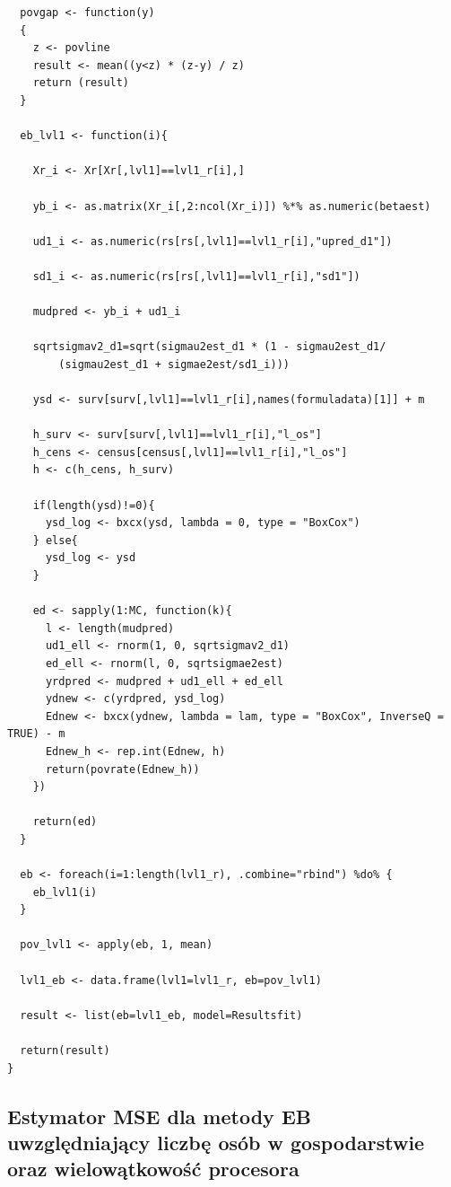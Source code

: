 \begin{verbatim}
  povgap <- function(y)     
  {
    z <- povline
    result <- mean((y<z) * (z-y) / z) 
    return (result)
  }
  
  eb_lvl1 <- function(i){
    
    Xr_i <- Xr[Xr[,lvl1]==lvl1_r[i],]
    
    yb_i <- as.matrix(Xr_i[,2:ncol(Xr_i)]) %*% as.numeric(betaest)
    
    ud1_i <- as.numeric(rs[rs[,lvl1]==lvl1_r[i],"upred_d1"])
    
    sd1_i <- as.numeric(rs[rs[,lvl1]==lvl1_r[i],"sd1"])
    
    mudpred <- yb_i + ud1_i
    
    sqrtsigmav2_d1=sqrt(sigmau2est_d1 * (1 - sigmau2est_d1/
    	(sigmau2est_d1 + sigmae2est/sd1_i)))
    
    ysd <- surv[surv[,lvl1]==lvl1_r[i],names(formuladata)[1]] + m
    
    h_surv <- surv[surv[,lvl1]==lvl1_r[i],"l_os"]
    h_cens <- census[census[,lvl1]==lvl1_r[i],"l_os"]
    h <- c(h_cens, h_surv)

    if(length(ysd)!=0){
      ysd_log <- bxcx(ysd, lambda = 0, type = "BoxCox")
    } else{
      ysd_log <- ysd
    }
    
    ed <- sapply(1:MC, function(k){
      l <- length(mudpred)
      ud1_ell <- rnorm(1, 0, sqrtsigmav2_d1)
      ed_ell <- rnorm(l, 0, sqrtsigmae2est)
      yrdpred <- mudpred + ud1_ell + ed_ell
      ydnew <- c(yrdpred, ysd_log)
      Ednew <- bxcx(ydnew, lambda = lam, type = "BoxCox", InverseQ = TRUE) - m
      Ednew_h <- rep.int(Ednew, h)
      return(povrate(Ednew_h))
    })
    
    return(ed)
  }
  
  eb <- foreach(i=1:length(lvl1_r), .combine="rbind") %do% {
    eb_lvl1(i)
  }
  
  pov_lvl1 <- apply(eb, 1, mean)
  
  lvl1_eb <- data.frame(lvl1=lvl1_r, eb=pov_lvl1)
  
  result <- list(eb=lvl1_eb, model=Resultsfit)
  
  return(result)
}
\end{verbatim}

\subsection*{Estymator MSE dla metody EB uwzględniający liczbę osób w gospodarstwie oraz wielowątkowość procesora}

